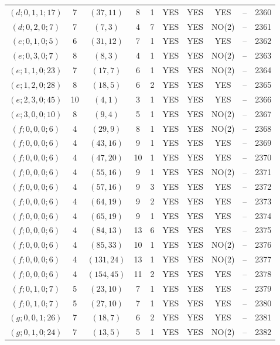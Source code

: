 \begin{longtable}{|c|c|c|c|c|c|c|c|c|c|}
$(d; 0, 1, 1; 17)$ & 7 & $(37, 11)$ & 8 & 1 & YES & YES & YES & -- & 2360\\
$(d; 0, 2, 0; 7)$ & 7 & $(7, 3)$ & 4 & 7 & YES & YES & NO(2) & -- & 2361\\
$(e; 0, 1, 0; 5)$ & 6 & $(31, 12)$ & 7 & 1 & YES & YES & YES & -- & 2362\\
$(e; 0, 3, 0; 7)$ & 8 & $(8, 3)$ & 4 & 1 & YES & YES & NO(2) & -- & 2363\\
$(e; 1, 1, 0; 23)$ & 7 & $(17, 7)$ & 6 & 1 & YES & YES & NO(2) & -- & 2364\\
$(e; 1, 2, 0; 28)$ & 8 & $(18, 5)$ & 6 & 2 & YES & YES & YES & -- & 2365\\
$(e; 2, 3, 0; 45)$ & 10 & $(4, 1)$ & 3 & 1 & YES & YES & YES & -- & 2366\\
$(e; 3, 0, 0; 10)$ & 8 & $(9, 4)$ & 5 & 1 & YES & YES & NO(2) & -- & 2367\\
$(f; 0, 0, 0; 6)$ & 4 & $(29, 9)$ & 8 & 1 & YES & YES & NO(2) & -- & 2368\\
$(f; 0, 0, 0; 6)$ & 4 & $(43, 16)$ & 9 & 1 & YES & YES & YES & -- & 2369\\
$(f; 0, 0, 0; 6)$ & 4 & $(47, 20)$ & 10 & 1 & YES & YES & YES & -- & 2370\\
$(f; 0, 0, 0; 6)$ & 4 & $(55, 16)$ & 9 & 1 & YES & YES & NO(2) & -- & 2371\\
$(f; 0, 0, 0; 6)$ & 4 & $(57, 16)$ & 9 & 3 & YES & YES & YES & -- & 2372\\
$(f; 0, 0, 0; 6)$ & 4 & $(64, 19)$ & 9 & 2 & YES & YES & YES & -- & 2373\\
$(f; 0, 0, 0; 6)$ & 4 & $(65, 19)$ & 9 & 1 & YES & YES & YES & -- & 2374\\
$(f; 0, 0, 0; 6)$ & 4 & $(84, 13)$ & 13 & 6 & YES & YES & YES & -- & 2375\\
$(f; 0, 0, 0; 6)$ & 4 & $(85, 33)$ & 10 & 1 & YES & YES & NO(2) & -- & 2376\\
$(f; 0, 0, 0; 6)$ & 4 & $(131, 24)$ & 13 & 1 & YES & YES & NO(2) & -- & 2377\\
$(f; 0, 0, 0; 6)$ & 4 & $(154, 45)$ & 11 & 2 & YES & YES & YES & -- & 2378\\
$(f; 0, 1, 0; 7)$ & 5 & $(23, 10)$ & 7 & 1 & YES & YES & YES & -- & 2379\\
$(f; 0, 1, 0; 7)$ & 5 & $(27, 10)$ & 7 & 1 & YES & YES & YES & -- & 2380\\
$(g; 0, 0, 1; 26)$ & 7 & $(18, 7)$ & 6 & 2 & YES & YES & YES & -- & 2381\\
$(g; 0, 1, 0; 24)$ & 7 & $(13, 5)$ & 5 & 1 & YES & YES & NO(2) & -- & 2382\\

\end{longtable}
